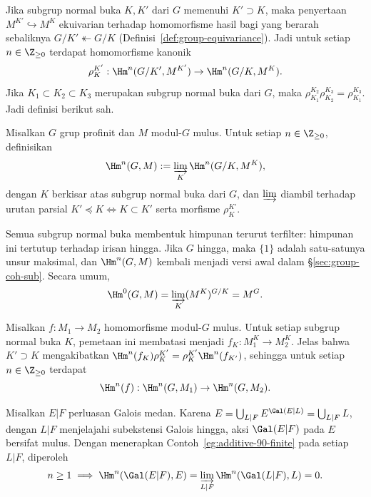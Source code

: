 Jika subgrup normal buka $K,K'$ dari $G$ memenuhi $K'\supset K$, maka
penyertaan $M^{K'}\hookrightarrow M^K$ ekuivarian terhadap homomorfisme hasil
bagi yang berarah sebaliknya $G/K'\twoheadleftarrow G/K$
(Definisi~\ref{def:group-equivariance}). Jadi untuk setiap
$n\in\Z_{\geq0}$ terdapat homomorfisme kanonik
\[ \rho^{K'}_K:\Hm^n(G/K',M^{K'})\to\Hm^n(G/K,M^K). \]
Jika $K_1\subset K_2\subset K_3$ merupakan subgrup normal buka dari $G$,
maka $\rho^{K_2}_{K_1}\rho^{K_3}_{K_2}=\rho^{K_3}_{K_1}$. Jadi definisi
berikut sah.

\begin{definition}
	Misalkan $G$ grup profinit dan $M$ modul-$G$ mulus. Untuk setiap
	$n\in\Z_{\geq0}$, definisikan
	\[ \Hm^n(G,M):=\varinjlim_K\Hm^n(G/K,M^K), \]
	dengan $K$ berkisar atas subgrup normal buka dari $G$, dan $\varinjlim$
	diambil terhadap urutan parsial
	$K'\preceq K\iff K\subset K'$ serta morfisme $\rho^{K'}_K$.
\end{definition}

Semua subgrup normal buka membentuk himpunan terurut terfilter: himpunan ini
tertutup terhadap irisan hingga. Jika $G$ hingga, maka $\{1\}$ adalah satu-satunya
unsur maksimal, dan $\Hm^n(G,M)$ kembali menjadi versi awal dalam
\S\ref{sec:group-coh-sub}. Secara umum,
\[ \Hm^0(G,M)=\varinjlim_K(M^K)^{G/K}=M^G. \]

Misalkan $f:M_1\to M_2$ homomorfisme modul-$G$ mulus. Untuk setiap subgrup
normal buka $K$, pemetaan ini membatasi menjadi
$f_K:M_1^K\to M_2^K$. Jelas bahwa $K'\supset K$ mengakibatkan
$\Hm^n(f_K)\rho^{K'}_K=\rho^{K'}_K\Hm^n(f_{K'})$, sehingga untuk setiap
$n\in\Z_{\geq0}$ terdapat
\[ \Hm^n(f):\Hm^n(G,M_1)\to\Hm^n(G,M_2). \]

\begin{example}
	Misalkan $E|F$ perluasan Galois medan. Karena
	$E=\bigcup_{L|F}E^{\Gal(E|L)}=\bigcup_{L|F}L$, dengan $L|F$ menjelajahi
	subekstensi Galois hingga, aksi $\Gal(E|F)$ pada $E$ bersifat mulus.
	Dengan menerapkan Contoh~\ref{eg:additive-90-finite} pada setiap $L|F$,
	diperoleh
	\[ n\geq1\implies\Hm^n(\Gal(E|F),E)
	=\varinjlim_{L|F}\Hm^n(\Gal(L|F),L)=0. \]
\end{example}

